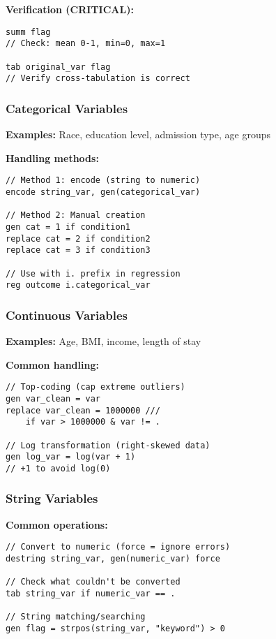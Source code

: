 ﻿\documentclass[8pt,letterpaper]{article}
\begin{document}
\begin{multicols}{2}
\textbf{Verification (CRITICAL):}
\begin{lstlisting}
summ flag
// Check: mean 0-1, min=0, max=1

tab original_var flag
// Verify cross-tabulation is correct
\end{lstlisting}

\subsubsection{Categorical Variables}

\textbf{Examples:} Race, education level, admission type, age groups

\textbf{Handling methods:}
\begin{lstlisting}
// Method 1: encode (string to numeric)
encode string_var, gen(categorical_var)

// Method 2: Manual creation
gen cat = 1 if condition1
replace cat = 2 if condition2
replace cat = 3 if condition3

// Use with i. prefix in regression
reg outcome i.categorical_var
\end{lstlisting}

\subsubsection{Continuous Variables}

\textbf{Examples:} Age, BMI, income, length of stay

\textbf{Common handling:}
\begin{lstlisting}
// Top-coding (cap extreme outliers)
gen var_clean = var
replace var_clean = 1000000 ///
    if var > 1000000 & var != .

// Log transformation (right-skewed data)
gen log_var = log(var + 1)
// +1 to avoid log(0)
\end{lstlisting}

\subsubsection{String Variables}

\textbf{Common operations:}
\begin{lstlisting}
// Convert to numeric (force = ignore errors)
destring string_var, gen(numeric_var) force

// Check what couldn't be converted
tab string_var if numeric_var == .

// String matching/searching
gen flag = strpos(string_var, "keyword") > 0
\end{lstlisting}


\end{multicols}
\end{document}
